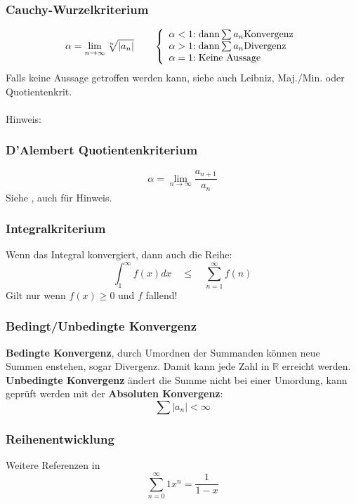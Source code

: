 \subsubsection{Cauchy-Wurzelkriterium}\label{W-Kriterium}
\[\alpha = \lim\limits_{n \rightarrow \infty}{\sqrt[n]{\left|a_n\right|}}\qquad
\left\lbrace
\begin{array}{r@{}l}
	\alpha < 1 &: \text{dann} \sum a_n \text{Konvergenz} \\
	\alpha > 1 &: \text{dann} \sum a_n \text{Divergenz} \\
	\alpha = 1 &: \text{Keine Aussage} \\
\end{array}\right. \]
Falls keine Aussage getroffen werden kann, siehe auch Leibniz, Maj./Min. oder Quotientenkrit.
\\ \\
\noindent Hinweis:

\subsubsection{D'Alembert Quotientenkriterium}
\[\alpha = \lim\limits_{n \rightarrow \infty}{\frac{a_{n+1}}{a_n}}\]
Siehe , auch für Hinweis.

\subsubsection{Integralkriterium}
Wenn das Integral konvergiert, dann auch die Reihe:
\[\int_{1}^{\infty}f(x)dx \quad\leq\quad \sum_{n=1}^{\infty}f(n)\]
Gilt nur wenn $f(x) \geq 0$ und $f$ fallend!

\subsubsection{Bedingt/Unbedingte Konvergenz}
\textbf{Bedingte Konvergenz}, durch Umordnen der Summanden können neue Summen enstehen, sogar Divergenz. Damit kann jede Zahl in $\mathbb{R}$ erreicht werden.\\
\textbf{Unbedingte Konvergenz} ändert die Summe nicht bei einer Umordung, kann geprüft werden mit der \textbf{Absoluten Konvergenz}:
\[\sum\left|a_n\right| < \infty\]

\subsubsection{Reihenentwicklung}
Weitere Referenzen in 
\[\sum_{n = 0}^{\infty}1x^n = \frac{1}{1-x}\]

